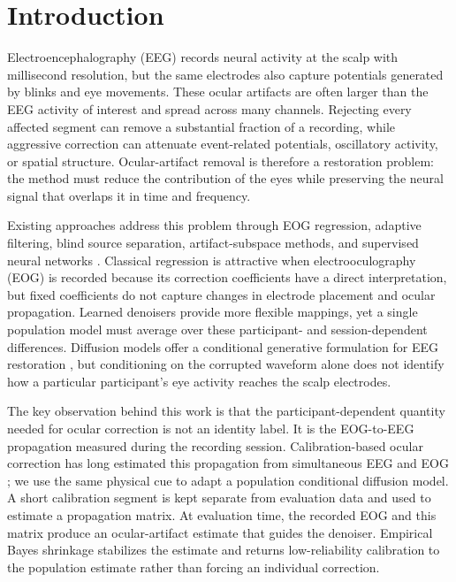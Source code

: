 \section{Introduction}
\label{sec:introduction}

Electroencephalography (EEG) records neural activity at the scalp with millisecond resolution, but the same electrodes also capture potentials generated by blinks and eye movements. These ocular artifacts are often larger than the EEG activity of interest and spread across many channels. Rejecting every affected segment can remove a substantial fraction of a recording, while aggressive correction can attenuate event-related potentials, oscillatory activity, or spatial structure. Ocular-artifact removal is therefore a restoration problem: the method must reduce the contribution of the eyes while preserving the neural signal that overlaps it in time and frequency.

Existing approaches address this problem through EOG regression, adaptive filtering, blind source separation, artifact-subspace methods, and supervised neural networks \cite{gratton1983ocular,semlitsch1986ocular,jung2000bss,chang2020asr,zhang2021eegdenoisenet,yu2022deepseparator}. Classical regression is attractive when electrooculography (EOG) is recorded because its correction coefficients have a direct interpretation, but fixed coefficients do not capture changes in electrode placement and ocular propagation. Learned denoisers provide more flexible mappings, yet a single population model must average over these participant- and session-dependent differences. Diffusion models offer a conditional generative formulation for EEG restoration \cite{huang2025eegdfus}, but conditioning on the corrupted waveform alone does not identify how a particular participant's eye activity reaches the scalp electrodes.

The key observation behind this work is that the participant-dependent quantity needed for ocular correction is not an identity label. It is the EOG-to-EEG propagation measured during the recording session. Calibration-based ocular correction has long estimated this propagation from simultaneous EEG and EOG \cite{gratton1983ocular,kobler2020sgeyesub}; we use the same physical cue to adapt a population conditional diffusion model. A short calibration segment is kept separate from evaluation data and used to estimate a propagation matrix. At evaluation time, the recorded EOG and this matrix produce an ocular-artifact estimate that guides the denoiser. Empirical Bayes shrinkage stabilizes the estimate and returns low-reliability calibration to the population estimate rather than forcing an individual correction.

